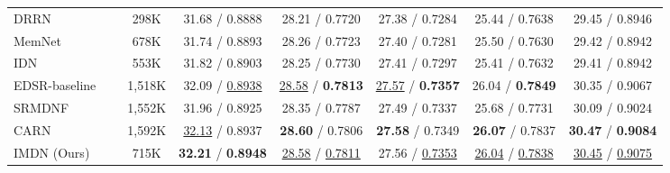\documentclass[sigconf]{acmart}
\begin{document}
\begin{table*}[htpb]
\begin{tabular}{|l|c|c|c|c|c|c|c|}
		DRRN~\cite{DRRN} &  & 298K & 31.68 / 0.8888 & 28.21 / 0.7720 & 27.38 / 0.7284 & 25.44 / 0.7638 & 29.45 / 0.8946 \\
		
		MemNet~\cite{MemNet} &  & 678K & 31.74 / 0.8893 & 28.26 / 0.7723 & 27.40 / 0.7281 & 25.50 / 0.7630 & 29.42 / 0.8942 \\
		
		IDN~\cite{IDN} &  & 553K & 31.82 / 0.8903 & 28.25 / 0.7730 & 27.41 / 0.7297 &  25.41 / 0.7632 & 29.41 / 0.8942 \\
		
		EDSR-baseline~\cite{EDSR} &  & 1,518K & 32.09 / \underline{0.8938} &  \underline{28.58} / \textbf{0.7813} & \underline{27.57} / \textbf{0.7357} & 26.04 /  \textbf{0.7849} & 30.35 / 0.9067 \\
		
		SRMDNF~\cite{SRMDNF} &  & 1,552K & 31.96 / 0.8925 & 28.35 / 0.7787 & 27.49 / 0.7337 & 25.68 / 0.7731 & 30.09 / 0.9024\\
		
		CARN~\cite{CARN} &  & 1,592K & \underline{32.13} / 0.8937 & \textbf{28.60} / 0.7806 &  \textbf{27.58} / 0.7349 & \textbf{26.07} / 0.7837  & \textbf{30.47} / \textbf{0.9084} \\
		
		IMDN (Ours) &  & 715K & \textbf{32.21} / \textbf{0.8948} & \underline{28.58} / \underline{0.7811} & 27.56 / \underline{0.7353} & \underline{26.04} / \underline{0.7838} & \underline{30.45} / \underline{0.9075} \\
		\hline
		
	\end{tabular}
	\label{tab:psnr-ssim}
\end{table*}
\end{document}
